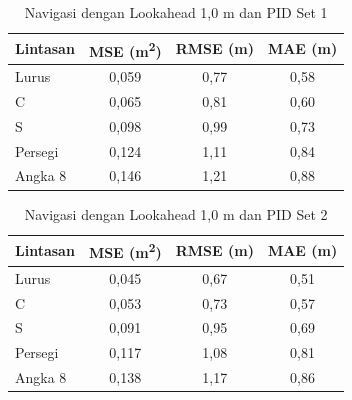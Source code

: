 \begin{table}[H]
	\centering
	\caption{Navigasi dengan Lookahead 1{,}0 m dan PID Set 1}
	\label{tab:navigasi_lh10_pid1}
	\begin{tabular}{|l|c|c|c|}
		\hline
		Lintasan & MSE (m\textsuperscript{2}) & RMSE (m) & MAE (m) \\
		\hline
		Lurus    & 0{,059}                    & 0{,77}   & 0{,58}  \\
		C        & 0{,065}                    & 0{,81}   & 0{,60}  \\
		S        & 0{,098}                    & 0{,99}   & 0{,73}  \\
		Persegi  & 0{,124}                    & 1{,11}   & 0{,84}  \\
		Angka 8  & 0{,146}                    & 1{,21}   & 0{,88}  \\
		\hline
	\end{tabular}
\end{table}

\begin{table}[H]
	\centering
	\caption{Navigasi dengan Lookahead 1{,}0 m dan PID Set 2}
	\label{tab:navigasi_lh10_pid2}
	\begin{tabular}{|l|c|c|c|}
		\hline
		Lintasan & MSE (m\textsuperscript{2}) & RMSE (m) & MAE (m) \\
		\hline
		Lurus    & 0{,045}                    & 0{,67}   & 0{,51}  \\
		C        & 0{,053}                    & 0{,73}   & 0{,57}  \\
		S        & 0{,091}                    & 0{,95}   & 0{,69}  \\
		Persegi  & 0{,117}                    & 1{,08}   & 0{,81}  \\
		Angka 8  & 0{,138}                    & 1{,17}   & 0{,86}  \\
		\hline
	\end{tabular}
\end{table}

